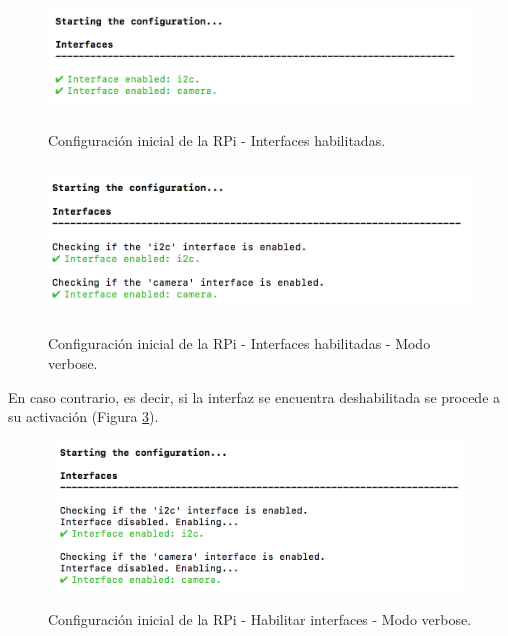 \documentclass[12pt,a4paper, twoside]{report}
\begin{document}
	 \begin{figure}[!ht]   
		\caption{Configuración inicial de la RPi - Interfaces habilitadas.} 
		\begin{center} 
			\includegraphics[width=14cm,height=3cm]{Images/userGuide/setup/interfaceEnabled} \\
			\label{fig:userguide_setup_interface} 
		\end{center}  
	\end{figure}
			
	\begin{figure}[!ht]   
		\caption{Configuración inicial de la RPi - Interfaces habilitadas - Modo verbose.} 
		\begin{center} 
			\includegraphics[width=14cm,height=4cm]{Images/userGuide/setup/interfaceEnabledVerbose} \\
			\label{fig:userguide_setup_interface_verbose} 
		\end{center}  
	\end{figure}
	
	\newpage
	
	En caso contrario, es decir, si la interfaz se encuentra deshabilitada se procede a su activación (Figura \ref{fig:userguide_setup_enableinterface_verbose}).

	\begin{figure}[!ht]   
		\caption{Configuración inicial de la RPi - Habilitar interfaces - Modo verbose.} 
		\begin{center} 
			\includegraphics[width=14cm,height=4cm]{Images/userGuide/setup/enableInterfaceVerbose} \\
			\label{fig:userguide_setup_enableinterface_verbose} 
		\end{center}  
	\end{figure}
	
\end{document}

